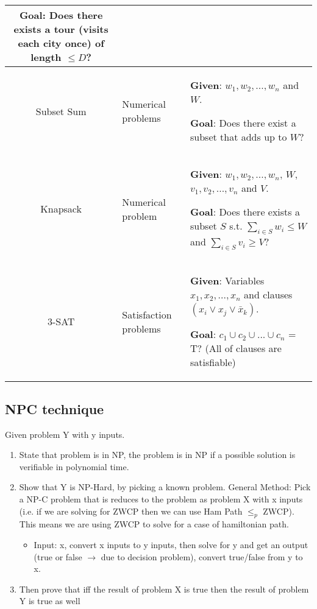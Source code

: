 \documentclass[]{article}
\begin{document}
\begin{tabular}{|c|p{4cm}|p{9cm}|}
    \textbf{Goal}: Does there exists a tour (visits each city once) of length $\leq D$?\\
    
    \hline
    Subset Sum & Numerical problems &
    \textbf{Given}: $w_1, w_2, ..., w_n$ and $W$.
    
    \textbf{Goal}: Does there exist a subset that adds up to $W$?\\
    \hline
    Knapsack & Numerical problem &
    \textbf{Given}: $w_1, w_2, ..., w_n$, $W$, $v_1, v_2, ..., v_n$ and $V$.
    
    \textbf{Goal}: Does there exists a subset $S$ s.t. $\sum_{i \in S}w_i \leq W$ and $\sum_{i \in S}v_i \geq V$?\\
    \hline
    3-SAT & Satisfaction problems &
    \textbf{Given}: Variables $x_1, x_2, ..., x_n$ and clauses $(x_i\lor x_j \lor \bar{x}_k)$.
    
    \textbf{Goal}: $c_1 \cup c_2 \cup ... \cup c_n$ = T? (All of clauses are satisfiable)\\
    \hline
\end{tabular}
\subsection{NPC technique}
Given problem Y with y inputs.
\begin{enumerate}
    \item State that problem is in NP, the problem is in NP if a possible solution is verifiable in polynomial time.
    \item Show that Y is NP-Hard, by picking a known problem. General Method: Pick a NP-C problem that is reduces to the problem as problem X with x inputs (i.e. if we are solving for ZWCP then we can use Ham Path $\leq_p$ ZWCP). This means we are using ZWCP to solve for a case of hamiltonian path.
    \begin{itemize}
        \item Input: x, convert x inputs to y inputs, then solve for y and get an output (true or false $\rightarrow$ due to decision problem), convert true/false from y to x.
    \end{itemize}
    \item Then prove that iff the result of problem X is true then the result of problem Y is true as well
\end{enumerate}
\end{document}
